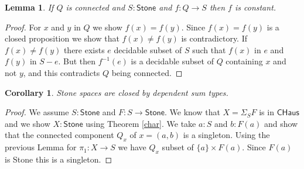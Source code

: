\documentclass[10pt,a4paper]{article}
\newtheorem{corollary}{Corollary}[section]
\newtheorem{lemma}{Lemma}[section]
\newcommand{\Stone}{\mathsf{Stone}}
\newcommand{\CHaus}{\mathsf{CHaus}}
\begin{document}
\begin{lemma}
  If $Q$ is connected and $S:\Stone$ and $f:Q\rightarrow S$ then $f$ is constant.
\end{lemma}

\begin{proof}
  For $x$ and $y$ in $Q$ we show $f(x)=f(y)$. Since $f(x) = f(y)$ is a closed proposition
  we show that $f(x)\neq f(y)$ is contradictory. If $f(x)\neq f(y)$ there exists $e$ decidable
  subset of $S$ such that $f(x)$ in $e$ and $f(y)$ in $S-e$. But then $f^{-1}(e)$ is a decidable
  subset of $Q$ containing $x$ and not $y$, and this contradicts $Q$ being connected.
\end{proof}

\begin{corollary}
  Stone spaces are closed by dependent sum types.
\end{corollary}

\begin{proof}
  We assume $S:\Stone$ and $F:S\rightarrow \Stone$. We know that $X = \Sigma_SF$ is in $\CHaus$
  and we show $X:\Stone$ using Theorem \ref{char}. We take $a:S$ and $b:F(a)$ and show that the
  connected component $Q_x$ of $x = (a,b)$ is a singleton. Using the previous Lemma for
  $\pi_1:X\rightarrow S$ we have $Q_x$ subset of $\{a\}\times F(a)$. Since $F(a)$ is Stone this
  is a singleton.
\end{proof}
\end{document}
